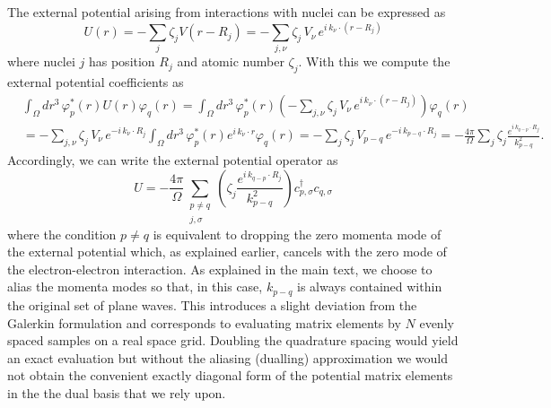 \documentclass[superscriptaddress,aps,pra,nofootinbib,notitlepage,10pt,longbibliography]{revtex4-1}
\begin{document}
The external potential arising from interactions with nuclei can be expressed as
\begin{equation}
U \left(r\right) = -\sum_{j} \zeta_j V\left(r - R_j\right) = -\sum_{j,\nu} \zeta_j \, V_\nu \, e^{i \, k_\nu \cdot \left(r - R_j\right)} 
\end{equation} 
where nuclei $j$ has position $R_j$ and atomic number $\zeta_j$. With this we compute the external potential coefficients as
\begin{align}
& \int_\Omega dr^3 \, \varphi_p^*\left(r\right) U\left(r\right) \varphi_q\left(r\right) =
%
\int_\Omega dr^3 \, \varphi_p^*\left(r\right) \left(- \sum_{j,\nu} \zeta_j \, V_\nu \, e^{i \, k_\nu \cdot \left(r - R_j\right)} \right) \varphi_q\left(r\right)\\
%
& =- \sum_{j,\nu} \zeta_j \, V_\nu \, e^{-i \, k_\nu \cdot R_j} \int_{\Omega} dr^3 \, \varphi_p^*\left(r\right) e^{i \, k_\nu \cdot r} \varphi_q\left(r\right)
%
 = - \sum_{j} \zeta_j \, V_{p-q} \, e^{-i \, k_{p-q} \cdot R_j}
%
=  -\frac{4 \pi}{\Omega} \sum_{j} \zeta_j \frac{e^{i \, k_{q-p} \cdot R_j}}{k_{p-q}^2}.\nonumber
\end{align}
Accordingly, we can write the external potential operator as
\begin{equation}
\label{eq:pw_u}
U = -\frac{4 \pi}{\Omega} \sum_{\substack{p \neq q \\ j,\sigma}} \left(\zeta_j \frac{e^{i \, k_{q-p} \cdot R_j}}{k_{p-q}^2}\right) c^\dagger_{p, \sigma} c_{q, \sigma}
\end{equation}
where the condition $p \neq q$ is equivalent to dropping the zero momenta mode of the external potential which, as explained earlier, cancels with the zero mode of the electron-electron interaction. As explained in the main text, we choose to alias the momenta modes so that, in this case, $k_{p-q}$ is always contained within the original set of plane waves. This introduces a slight deviation from the Galerkin formulation and corresponds to evaluating matrix elements by  $N$ evenly spaced samples on a real space grid.
Doubling the quadrature spacing
would yield an exact evaluation but without the aliasing (dualling) approximation we would not obtain the convenient exactly diagonal form of the potential matrix elements in the the dual basis that we rely upon.
\end{document}
